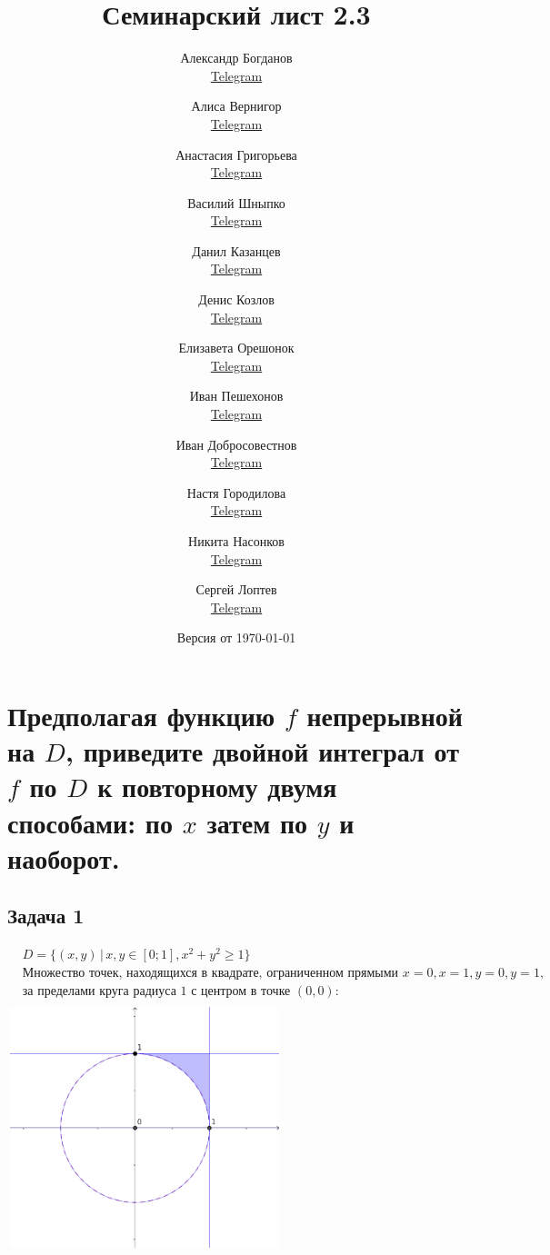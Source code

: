 \documentclass[a4paper, fleqn]{article}
\title{Семинарский лист 2.3}
\author{
    Александр Богданов   \\ \href{https://t.me/SphericalPotatoInVacuum}{Telegram} \and
    Алиса Вернигор       \\ \href{https://t.me/allisyonok}{Telegram} \and
    Анастасия Григорьева \\ \href{https://t.me/weifoll}{Telegram} \and
    Василий Шныпко       \\ \href{https://t.me/yourvash}{Telegram} \and
    Данил Казанцев       \\ \href{https://t.me/vserosbuybuy}{Telegram} \and
    Денис Козлов         \\ \href{https://t.me/DKozl50}{Telegram} \and
    Елизавета Орешонок   \\ \href{https://t.me/eaoresh}{Telegram} \and
    Иван Пешехонов       \\ \href{https://t.me/JohanDDC}{Telegram} \and
    Иван Добросовестнов  \\ \href{https://t.me/ivankot13}{Telegram} \and
    Настя Городилова     \\ \href{https://t.me/nastygorodi}{Telegram} \and
    Никита Насонков      \\ \href{https://t.me/nnv_nick}{Telegram} \and
    Сергей Лоптев        \\ \href{https://t.me/beast_sl}{Telegram}
}
\date{Версия от {\ddmmyyyydate\today} \currenttime}
\begin{document}
    \maketitle
    
    \section*{Предполагая функцию $f$ непрерывной на $D$, приведите двойной интеграл от $f$ по $D$ к повторному 
    двумя способами: по $x$ затем по $y$ и наоборот.}
    \subsection*{Задача 1\\[-40 pt]}
    \begin{align*}
        & D = \{ (x, y) \,|\, x, y \in [0; 1], x^2 + y^2 \ge 1 \} \\[3 pt]
        & \text{Множество точек, находящихся в квадрате, ограниченном прямыми $x = 0, x = 1, y = 0, y = 1$,} \\
        & \text{за пределами круга радиуса 1 с центром в точке $(0, 0)$:} \\[3 pt]
    \end{align*}
        \includegraphics[width=8cm, height=7cm]{task 1.png}\\
\end{document}

